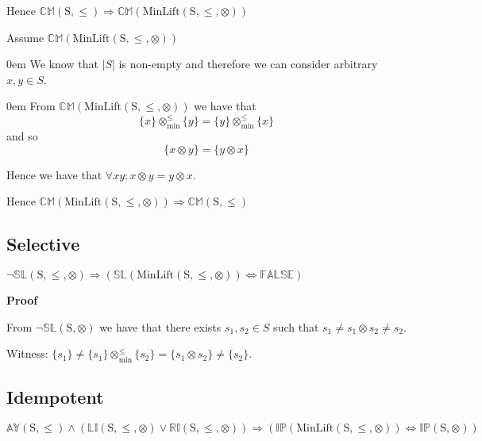 \documentclass[10pt]{article}
\newcommand{\propname}[1]{{\mathbb{#1}}}
\newcommand{\minlift}{\otimes_{\min}^{\leq}}
\newcommand{\proof}{\vspace{1em} \textbf{Proof} \vspace{1em}}
\newenvironment{ind}[0]{\begin{addmargin}[1em]{0em}\vspace{0.5em}}{\end{addmargin}\vspace{0.5em}}
\begin{document}
Hence $\propname{CM}\mathrm{(S,\leq)} \Rightarrow \propname{CM}(\mathrm{MinLift(S,\leq,\otimes)})$

\vspace{2em}

Assume $\propname{CM}(\mathrm{MinLift(S,\leq,\otimes)})$

\begin{ind}
We know that $|S|$ is non-empty and therefore we can consider arbitrary $x, y \in S$. 
\begin{ind}
From $\propname{CM}(\mathrm{MinLift(S,\leq,\otimes)})$ we have that
\begin{equation*}
\{ x \} \minlift \{ y \} = \{ y \} \minlift \{ x \}
\end{equation*}
and so
\begin{equation*}
\{x \otimes y\} = \{ y \otimes x \}
\end{equation*}
\end{ind}
Hence we have that $\forall x y : x \otimes y = y \otimes x$.
\end{ind}
Hence $\propname{CM}(\mathrm{MinLift(S,\leq,\otimes)}) \Rightarrow \propname{CM}\mathrm{(S,\leq)}$



\subsection{Selective}

$\neg\propname{SL}(\mathrm{S,\leq,\otimes}) \Rightarrow (\propname{SL}(\mathrm{MinLift(S,\leq,\otimes)}) \Leftrightarrow \propname{FALSE})$

\proof

From $\neg \propname{SL}(\mathrm{S,\otimes})$ we have that there exists $s_1 , s_2 \in S$ such that $s_1 \neq s_1 \otimes s_2 \neq s_2$.

\vspace{0.5em}

Witness: $\{ s_1 \} \neq \{ s_1 \} \minlift \{ s_2 \} = \{ s_1 \otimes s_2 \} \neq \{ s_2 \}$.



\subsection{Idempotent}
$\propname{AY}(\mathrm{S,\leq}) \wedge (\propname{LI}(\mathrm{S,\leq,\otimes}) \vee \propname{RI}(\mathrm{S,\leq,\otimes})) \Rightarrow (\propname{IP}(\mathrm{MinLift(S,\leq,\otimes)}) \Leftrightarrow \propname{IP}(\mathrm{S,\otimes}))$
\end{document}
